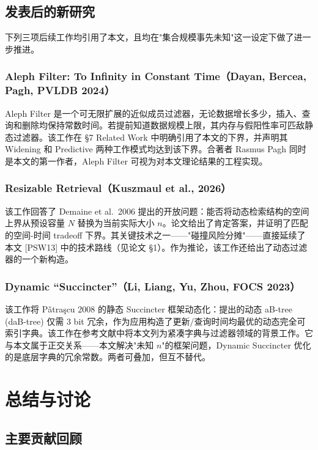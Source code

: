 \documentclass[UTF8,11pt,a4paper]{ctexart}
\begin{document}
\subsection{发表后的新研究}

下列三项后续工作均引用了本文，且均在"集合规模事先未知"这一设定下做了进一步推进。

\subsubsection*{Aleph Filter: To Infinity in Constant Time（Dayan, Bercea, Pagh, PVLDB 2024）}

Aleph Filter 是一个可无限扩展的近似成员过滤器，无论数据增长多少，插入、查询和删除均保持常数时间。若提前知道数据规模上限，其内存与假阳性率可匹敌静态过滤器。该工作在 §7 Related Work 中明确引用了本文的下界，并声明其 Widening 和 Predictive 两种工作模式均达到该下界。合著者 Rasmus Pagh 同时是本文的第一作者，Aleph Filter 可视为对本文理论结果的工程实现。

\subsubsection*{Resizable Retrieval（Kuszmaul et al., 2026）}

该工作回答了 Demaine et al.\ 2006 提出的开放问题：能否将动态检索结构的空间上界从预设容量 $N$ 替换为当前实际大小 $n$。论文给出了肯定答案，并证明了匹配的空间-时间 tradeoff 下界。其关键技术之一——"碰撞风险分摊"——直接延续了本文 [PSW13] 中的技术路线（见论文 §1）。作为推论，该工作还给出了动态过滤器的一个新构造。

\subsubsection*{Dynamic ``Succincter''（Li, Liang, Yu, Zhou, FOCS 2023）}

该工作将 P\v{a}tra\c{s}cu 2008 的静态 Succincter 框架动态化：提出的动态 aB-tree (daB-tree) 仅需 3 bit 冗余，作为应用构造了更新/查询时间均最优的动态完全可索引字典。该工作在参考文献中将本文列为紧凑字典与过滤器领域的背景工作。它与本文属于正交关系——本文解决"未知 $n$"的框架问题，Dynamic Succincter 优化的是底层字典的冗余常数。两者可叠加，但互不替代。

\section{总结与讨论}

\subsection{主要贡献回顾}
\end{document}
